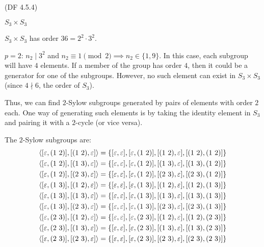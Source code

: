 \begin{problem}{(\textsf{DF 4.5.4})}
\begin{enumalph}
\begin{Answer}
\begin{enumalph}
        \item $S_3 \times S_3$
            
            \noindent
            $S_3 \times S_3$ has order $36 = 2^2 \cdot 3^2$.
            \begin{enumalph}
              \item $p=2$:
                $n_2 \mid 3^2$ and $n_2 \equiv 1 \pmod 2 \implies n_2 \in \{1, 9\}$.
                In this case, each subgroup will have $4$ elements.
                If a member of the group has order $4$, then it could be a generator
                for one of the subgroups. However, no such element can exist in
                $S_3 \times S_3$ (since $4 \nmid 6$, the order of $S_3$).
                
                \noindent
                Thus, we can find $2$-Sylow subgroups generated by pairs of elements
                with order $2$ each. One way of generating such elements is
                by taking the identity element in $S_3$ and pairing it with
                a $2$-cycle (or vice versa).

                The $2$-Sylow subgroups are:
                \begin{align}
                  \langle [\varepsilon, (1\ 2)], [(1\ 2), \varepsilon] \rangle &= \{[\varepsilon, \varepsilon], [\varepsilon, (1\ 2)], [(1\ 2), \varepsilon], [(1\ 2), (1\ 2)] \} \\
                  \langle [\varepsilon, (1\ 2)], [(1\ 3), \varepsilon] \rangle &= \{[\varepsilon, \varepsilon], [\varepsilon, (1\ 2)], [(1\ 3), \varepsilon], [(1\ 3), (1\ 2)] \} \\
                  \langle [\varepsilon, (1\ 2)], [(2\ 3), \varepsilon] \rangle &= \{[\varepsilon, \varepsilon], [\varepsilon, (1\ 2)], [(2\ 3), \varepsilon], [(2\ 3), (1\ 2)] \} \\
                  \langle [\varepsilon, (1\ 3)], [(1\ 2), \varepsilon] \rangle &= \{[\varepsilon, \varepsilon], [\varepsilon, (1\ 3)], [(1\ 2), \varepsilon], [(1\ 2), (1\ 3)] \} \\
                  \langle [\varepsilon, (1\ 3)], [(1\ 3), \varepsilon] \rangle &= \{[\varepsilon, \varepsilon], [\varepsilon, (1\ 3)], [(1\ 3), \varepsilon], [(1\ 3), (1\ 3)] \} \\
                  \langle [\varepsilon, (1\ 3)], [(2\ 3), \varepsilon] \rangle &= \{[\varepsilon, \varepsilon], [\varepsilon, (1\ 3)], [(2\ 3), \varepsilon], [(2\ 3), (1\ 3)] \} \\
                  \langle [\varepsilon, (2\ 3)], [(1\ 2), \varepsilon] \rangle &= \{[\varepsilon, \varepsilon], [\varepsilon, (2\ 3)], [(1\ 2), \varepsilon], [(1\ 2), (2\ 3)] \} \\
                  \langle [\varepsilon, (2\ 3)], [(1\ 3), \varepsilon] \rangle &= \{[\varepsilon, \varepsilon], [\varepsilon, (2\ 3)], [(1\ 3), \varepsilon], [(1\ 3), (2\ 3)] \} \\
                  \langle [\varepsilon, (2\ 3)], [(2\ 3), \varepsilon] \rangle &= \{[\varepsilon, \varepsilon], [\varepsilon, (2\ 3)], [(2\ 3), \varepsilon], [(2\ 3), (2\ 3)] \}
                \end{align}
  

\end{enumalph}
\end{enumalph}
\end{Answer}
\end{enumalph}
\end{problem}
